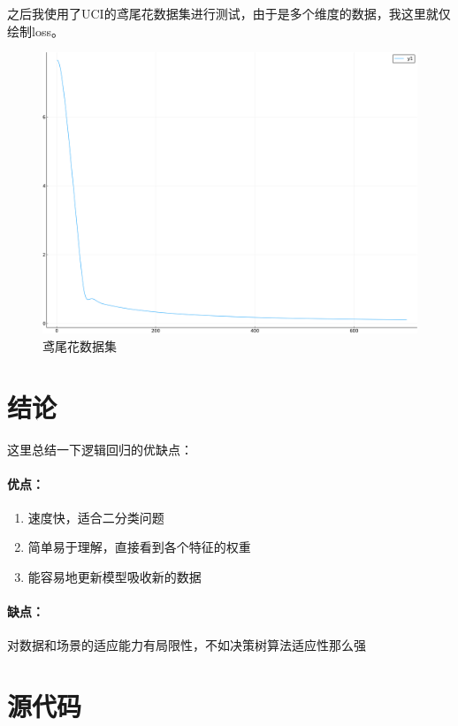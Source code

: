 \documentclass{ML}
\begin{document}
之后我使用了UCI的鸢尾花数据集进行测试，由于是多个维度的数据，我这里就仅绘制loss。

\begin{figure}[H]
	\centering
	\includegraphics[width=0.9\linewidth]{media/Logistic/iris-loss}
	\caption{鸢尾花数据集}
	\label{fig:iris-loss}
\end{figure}

\section{结论}

这里总结一下逻辑回归的优缺点：

\paragraph{优点：}
\begin{enumerate}
\item 速度快，适合二分类问题
\item 简单易于理解，直接看到各个特征的权重
\item 能容易地更新模型吸收新的数据
\end{enumerate}


\paragraph{缺点：}
对数据和场景的适应能力有局限性，不如决策树算法适应性那么强

\appendix

\section{源代码}

\inputminted[breaklines=true,frame=lines,mathescape=true]{julia}{../LogisticRegression.jl}
\end{document}
